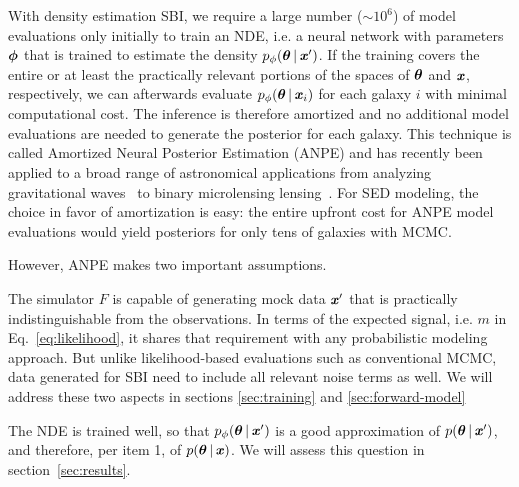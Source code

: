 With density estimation SBI, we require a large number (${\sim}10^6$) of model evaluations 
only initially to train an NDE, i.e. a neural network with parameters $\boldsymbol{\phi}$ that
is trained to estimate the density $p_\phi(\boldsymbol{\theta} \,|\, \textbf{\textit{x}}')$.
If the training covers the entire or at least the practically relevant portions of the
spaces of $\boldsymbol{\theta}$ and $\textbf{\textit{x}}$, respectively, we can afterwards evaluate 
$p_\phi(\boldsymbol{\theta}\,|\,\textbf{\textit{x}}_i)$ for each galaxy $i$ with minimal
computational cost. 
The inference is therefore amortized and no additional model evaluations are
needed to generate the posterior for each galaxy.
This technique is called  Amortized Neural Posterior Estimation (ANPE) 
and has recently been applied to a broad range of astronomical applications
from analyzing gravitational waves~\citep[\emph{e.g.}][]{wong2020,dax2021} to
binary microlensing lensing~\citep{zhang2021}.
For SED modeling, the choice in favor of amortization is easy: the 
entire upfront cost for ANPE model evaluations would yield posteriors for only tens of galaxies with MCMC.

However, ANPE makes two important assumptions.
\begin{compactenum}
\item The simulator $F$ is capable of generating mock data $\textbf{\textit{x}}'$ that is practically indistinguishable from the observations.
In terms of the expected signal, i.e. $m$ in Eq.~\ref{eq:likelihood}, it shares that requirement with any probabilistic modeling approach. But unlike likelihood-based evaluations such as conventional MCMC, data generated for SBI need to include all relevant noise terms as well. We will address these two aspects in sections \ref{sec:training} and \ref{sec:forward-model}
\item The NDE is trained well, so that $p_\phi(\boldsymbol{\theta} \,|\, \textbf{\textit{x}}')$ is a good approximation of $p(\boldsymbol{\theta} \,|\, \textbf{\textit{x}}')$, and therefore, per item 1, of $p(\boldsymbol{\theta} \,|\, \textbf{\textit{x}})$. We will assess this question in section~\ref{sec:results}.
\end{compactenum}

